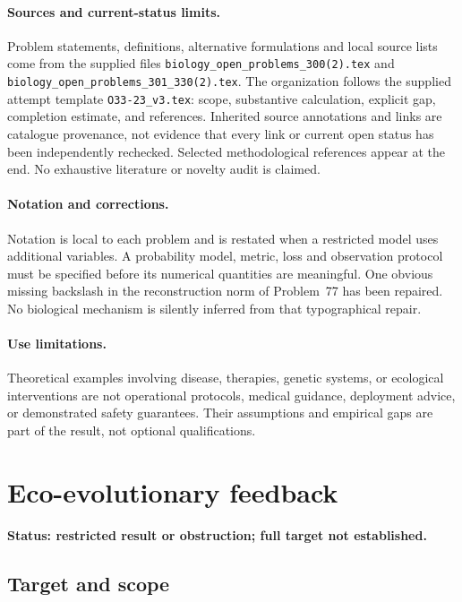\documentclass[11pt]{article}
\begin{document}
\paragraph{Sources and current-status limits.}
Problem statements, definitions, alternative formulations and local source lists
come from the supplied files
\texttt{biology\_open\_problems\_300(2).tex} and
\texttt{biology\_open\_problems\_301\_330(2).tex}.
The organization follows the supplied attempt template
\texttt{O33-23\_v3.tex}: scope, substantive calculation, explicit gap,
completion estimate, and references. Inherited source annotations and links are
catalogue provenance, not evidence that every link or current open status has
been independently rechecked. Selected methodological references appear at the
end. No exhaustive literature or novelty audit is claimed.

\paragraph{Notation and corrections.}
Notation is local to each problem and is restated when a restricted model uses
additional variables. A probability model, metric, loss and observation protocol
must be specified before its numerical quantities are meaningful. One obvious
missing backslash in the reconstruction norm of Problem~77 has been repaired.
No biological mechanism is silently inferred from that typographical repair.

\paragraph{Use limitations.}
Theoretical examples involving disease, therapies, genetic systems, or ecological
interventions are not operational protocols, medical guidance, deployment advice,
or demonstrated safety guarantees. Their assumptions and empirical gaps are part
of the result, not optional qualifications.


\section*{Eco-evolutionary feedback}
\label{prob:176}
\noindent\textbf{Status: restricted result or obstruction; full target not established.}
\subsection{Target and scope}
\end{document}
